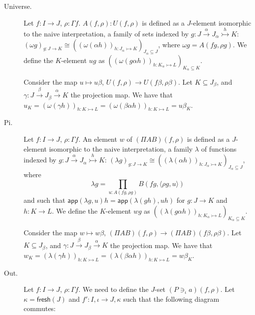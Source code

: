\documentclass{PaperTools/latex/llncs}
\newcommand\op[1]{∋_{#1}}
\def\fresh#1{\mathsf{fresh}(#1)}
\def\ie{\textit{i.e.}}
\def\app#1#2{\mathsf{app}(#1,#2)}
\begin{document}
\bigskip
\begin{description}
  \item[\sc Universe.]
    Let $f : I → J$, $ρ : Γf$.  $A(f,ρ) : U(f,ρ)$ is
    defined as a $J$-element isomorphic to the naive interpretation,
    a family of sets indexed by
    $g : J \stackrel{α}{→} J_α \stackrel {h}{↣} K$:
    $\left(ωg\right)_{g : J → K} ≅ \left(\left(ω(αh)\right)_{h : J_α ↣ K}\right)_{J_α ⊆ J}$,
    where $ωg = A(fg,ρg)$.
    We define the $K$-element $u g$ as
    $\left(\left(ω(gαh)\right)_{h : K_α ↣ L}\right)_{K_α ⊆ K}$.

    Consider the map $u ↦ uβ$, $U(f,ρ) → U(fβ,ρβ)$.  Let
    $K ⊆ J_β$, and $γ : J \stackrel{β}{→} J_β \stackrel{α}{→} K$ the projection map.
    We have that
    $u_K = \left(ω(γh)\right)_{h : K ↣ L}
         = \left(ω(βαh)\right)_{h : K ↣ L}
         = uβ_K$.

  \item[\sc Pi.]
    Let $f : I → J$, $ρ : Γf$.  An element $w$ of $(Π A B)(f,ρ)$ is
    defined as a $J$-element isomorphic to the naive interpretation, a
    family $λ$ of functions indexed by
    $g : J \stackrel{α}{→} J_α \stackrel {h}{↣} K$:
    $\left(λg\right)_{g : J → K} ≅ \left(\left(λ(αh)\right)_{h : J_α ↣ K}\right)_{J_α ⊆ J}$,
    where
    $$λ g = \prod_{u : A(fg,ρg)} B(fg,⟨ρg,u⟩) $$
    and such that
    $\app{λg} u h = \app{λ(gh)}{uh}$ for $g : J → K$ and $h : K → L$.
    We define the $K$-element $w g$ as
    $\left(\left(λ(gαh)\right)_{h : K_α ↣ L}\right)_{K_α ⊆ K}$.

    Consider the map $w ↦ wβ$, $(Π A B)(f,ρ) → (Π A B)(fβ,ρβ)$.  Let
    $K ⊆ J_β$, and $γ : J \stackrel{β}{→} J_β \stackrel{α}{→} K$ the projection map.
    We have that
    $w_K = \left(λ(γh)\right)_{h : K ↣ L}
         = \left(λ(βαh)\right)_{h : K ↣ L}
         = wβ_K$.


  \item[\sc Out.]
    Let $f : I → J$, $ρ : Γf$.  We need to define the $J$-set $(P \op {ι} a)(f,ρ)$.
    Let $κ = \fresh J$ and $f' : I,ι → J,κ$ such that the following
    diagram commutes:


\end{description}
\end{document}
